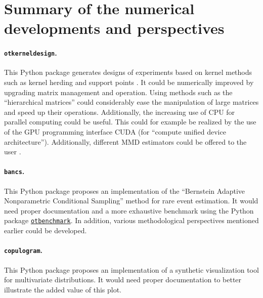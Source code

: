 \section*{Summary of the numerical developments and perspectives}

\paragraph{\texttt{otkerneldesign}.}
This Python package generates designs of experiments based on kernel methods such as kernel herding \citep{chen_2018_owt_diagram} and support points \citep{mak_joseph_2018}. 
It could be numerically improved by upgrading matrix management and operation. 
Using methods such as the ``hierarchical matrices'' \citep{borm_2003_hmat} could considerably ease the manipulation of large matrices and speed up their operations.  
Additionally, the increasing use of CPU for parallel computing could be useful. 
This could for example be realized by the use of the GPU programming interface CUDA (for ``compute unified device architecture''). 
Additionally, different MMD estimators could be offered to the user \citep{gretton_2006}. 


\paragraph{\texttt{bancs}.}
This Python package proposes an implementation of the ``Bernstein Adaptive Nonparametric Conditional Sampling'' method for rare event estimation. 
It would need proper documentation and a more exhaustive benchmark using the Python package \href{https://github.com/mbaudin47/otbenchmark/}{\texttt{otbenchmark}}\footnotemark. 
In addition, various methodological perspectives mentioned earlier could be developed. 


\paragraph{\texttt{copulogram}.}
This Python package proposes an implementation of a synthetic visualization tool for multivariate distributions. 
It would need proper documentation to better illustrate the added value of this plot. 

